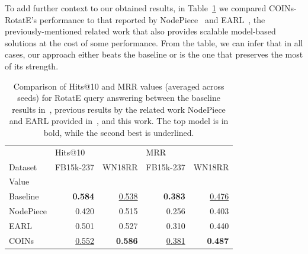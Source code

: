 To add further context to our obtained results, in Table~\ref{tab:performance_query_answering_related_work} we compared COINs-RotatE's performance to that reported by NodePiece~\cite{galkin_nodepiece_2022} and EARL~\cite{chen_entity-agnostic_2023}, the previously-mentioned related work that also provides scalable model-based solutions at the cost of some performance. From the table, we can infer that in all cases, our approach either beats the baseline or is the one that preserves the most of its strength.

\begin{table}[H]
  \caption[Comparison of Hits@10 and MRR values for query answering between the RotatE baseline, NodePiece, EARL, and COINs.]{Comparison of Hits@10 and MRR values (averaged across seeds) for RotatE query answering between the baseline results in~\cite{sun_rotate_2019}, previous results by the related work NodePiece and EARL provided in~\cite{chen_entity-agnostic_2023}, and this work. The top model is in bold, while the second best is underlined.}
  \label{tab:performance_query_answering_related_work}
  \centering
\begin{tabular}{lrrrr}
\toprule
{} & \multicolumn{2}{l}{Hits@10} & \multicolumn{2}{l}{MRR} \\
Dataset & FB15k-237 & WN18RR & FB15k-237 & WN18RR \\
Value     &           &        &           &        \\
\midrule
Baseline  &     \textbf{0.584} &  \underline{0.538} &  \textbf{0.383} &  \underline{0.476} \\
NodePiece &     0.420 &  0.515 &     0.256 &  0.403 \\
EARL      &     0.501 &  0.527 &     0.310 &  0.440 \\
COINs     &     \underline{0.552} &  \textbf{0.586} &     \underline{0.381} &  \textbf{0.487} \\
\bottomrule
\end{tabular}
\end{table}

